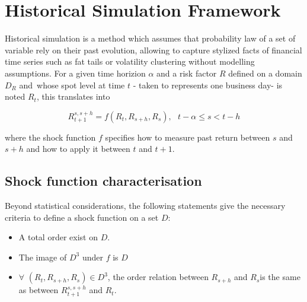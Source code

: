 \documentclass[3pt]{article}
\begin{document}
\bigskip

\bigskip

\bigskip

\bigskip

\bigskip

\bigskip

\bigskip

\bigskip

\section{Historical Simulation Framework}

Historical simulation is a method which assumes that probability law of a
set of variable rely on their past evolution, allowing to capture stylized
facts of financial time series such as fat tails or volatility clustering
without modelling assumptions. For a given time horizion $\alpha $ and a
risk factor $R$ defined on a domain $D_{R}$ and\ whose spot level at time $t$
- taken to represents one business day- is noted $R_{t}$, this translates
into

\begin{equation*}
R_{t+1}^{s,s+h}=f(R_{t},R_{s+h},R_{s}),\text{ \ \ }t-\alpha \leq s<t-h
\end{equation*}

where the shock function $f$ specifies how to measure past return between $s$
and $s+h$ and how to apply it between $t$ and $t+1$.

\bigskip 

\subsection{Shock function characterisation}

Beyond statistical considerations, the following statements give the
necessary criteria to define a shock function on a set $D$:

\begin{itemize}
\item A total order exist on $D.$

\item The image of $D^{3}$ under $f$ is $D$

\item $\forall $ $(R_{t},R_{s+h},R_{s})\in D^{3}$, the order relation
between $R_{s+h}$ and $R_{s}$is the same as between $R_{t+1}^{s,s+h}$ and $%
R_{t}.$
\end{itemize}

\bigskip
\end{document}
